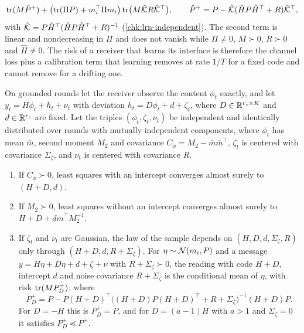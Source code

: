 \begin{remark}
\begin{equation}\label{eq:lrn-conditional-cost}
\operatorname{tr}(M\hat P^+)+\bigl(\operatorname{tr}(\Pi P)+m_i^\top\Pi m_i\bigr)\operatorname{tr}\bigl(M\hat{\mathcal{K}}R\hat{\mathcal{K}}^\top\bigr),\qquad\hat P^+=P-\hat{\mathcal{K}}(\hat HP\hat H^\top+R)\hat{\mathcal{K}}^\top,
\end{equation}
with $\hat{\mathcal{K}}=P\hat H^\top(\hat HP\hat H^\top+R)^{-1}$ (\cref{chk:lrn-independent}). The second term is linear and nondecreasing in $\Pi$ and does not vanish while $\Pi\ne0$, $M\succ0$, $R\succ0$ and $\hat H\ne0$. The risk of a receiver that learns its interface is therefore the channel loss plus a calibration term that learning removes at rate $1/T$ for a fixed code and cannot remove for a drifting one.
\end{remark}

\begin{proposition}\label{prop:lrn-absorption}
On grounded rounds let the receiver observe the content $\phi_t$ exactly, and let $y_t=H\phi_t+h_t+\nu_t$ with deviation $h_t=D\phi_t+d+\zeta_t$, where $D\in\mathbb{R}^{r_c\times K}$ and $d\in\mathbb{R}^{r_c}$ are fixed. Let the triples $(\phi_t,\zeta_t,\nu_t)$ be independent and identically distributed over rounds with mutually independent components, where $\phi_t$ has mean $\bar m$, second moment $M_2$ and covariance $C_\phi=M_2-\bar m\bar m^\top$, $\zeta_t$ is centered with covariance $\Sigma_\zeta$, and $\nu_t$ is centered with covariance $R$.
\begin{enumerate}
\item[(a)] If $C_\phi\succ0$, least squares with an intercept converges almost surely to $(H+D,d)$.
\item[(b)] If $M_2\succ0$, least squares without an intercept converges almost surely to $H+D+d\bar m^\top M_2^{-1}$.
\item[(c)] If $\zeta_t$ and $\nu_t$ are Gaussian, the law of the sample depends on $(H,D,d,\Sigma_\zeta,R)$ only through $(H+D,d,R+\Sigma_\zeta)$. For $\eta\sim\mathcal{N}(m_i,P)$ and a message $y=H\eta+D\eta+d+\zeta+\nu$ with $R+\Sigma_\zeta\succ0$, the reading with code $H+D$, intercept $d$ and noise covariance $R+\Sigma_\zeta$ is the conditional mean of $\eta$, with risk $\operatorname{tr}(MP^+_D)$, where
\begin{equation}\label{eq:lrn-absorbed-posterior}
P^+_D=P-P(H+D)^\top\bigl((H+D)P(H+D)^\top+R+\Sigma_\zeta\bigr)^{-1}(H+D)P.
\end{equation}
For $D=-H$ this is $P^+_D=P$, and for $D=(a-1)H$ with $a>1$ and $\Sigma_\zeta=0$ it satisfies $P^+_D\preceq P^+$.
\end{enumerate}
\end{proposition}

